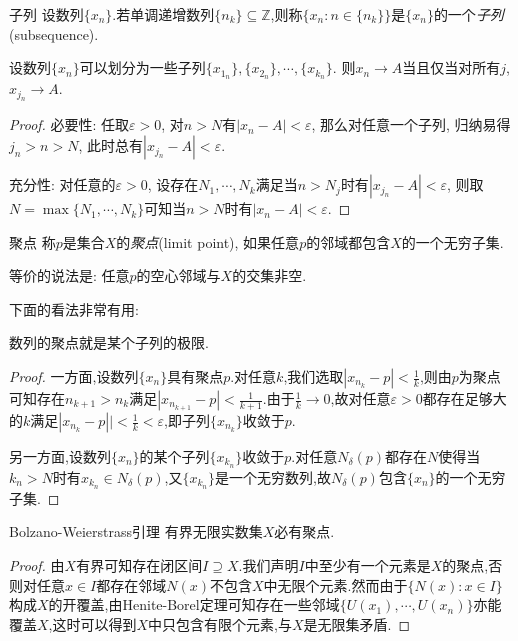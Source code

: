 \begin{definition}{子列}
	设数列$\{ x_n \}$.若单调递增数列$\{ n_k \} \subseteq \mathbb{Z}$,则称$\{ x_n:n \in  \{ n_k \} \}$是$\{ x_n \}$的一个\textit{子列}(subsequence).
\end{definition}

\begin{proposition}{}
	设数列$\{ x_n \}$可以划分为一些子列$\{ x_{1_n} \},\{ x_{2_n} \},\cdots ,\{ x_{k_n} \}$. 则$x_n \to A$当且仅当对所有$j$, $x_{j_n} \to A$. 
\end{proposition}
\begin{proof}
	必要性: 任取$\varepsilon >0$, 对$n>N$有$|x_n-A|<\varepsilon$, 那么对任意一个子列, 归纳易得$j_n>n>N$, 此时总有$|x_{j_n}-A|<\varepsilon$.
	
	充分性: 对任意的$\varepsilon >0$, 设存在$N_1,\cdots ,N_k$满足当$n>N_j$时有$|x_{j_n}-A|<\varepsilon$, 则取$N=\max \{ N_1,\cdots ,N_k \}$可知当$n>N$时有$|x_n-A|<\varepsilon$.
\end{proof}

\begin{definition}{聚点}
	称$p$是集合$X$的\textit{聚点}(limit point), 如果任意$p$的邻域都包含$X$的一个无穷子集.
\end{definition}
\begin{remark}
	等价的说法是: 任意$p$的空心邻域与$X$的交集非空. 
\end{remark}

下面的看法非常有用:

\begin{proposition}{}
	数列的聚点就是某个子列的极限.
\end{proposition}
\begin{proof}
	一方面,设数列$\{ x_n \}$具有聚点$p$.对任意$k$,我们选取$|x_{n_k}-p|<\frac{1}{k}$,则由$p$为聚点可知存在$n_{k+1}>n_k$满足$|x_{n_{k+1}}-p|<\frac{1}{k+1}$.由于$\frac{1}{k} \to 0$,故对任意$\varepsilon >0$都存在足够大的$k$满足$|x_{n_k}-p||<\frac{1}{k}<\varepsilon$,即子列$\{ x_{n_k} \}$收敛于$p$.
	
	另一方面,设数列$\{ x_n \}$的某个子列$\{ x_{k_n} \}$收敛于$p$.对任意$N_{\delta}(p)$都存在$N$使得当$k_n>N$时有$x_{k_n} \in N_{\delta}(p)$,又$\{ x_{k_n} \}$是一个无穷数列,故$N_{\delta}(p)$包含$\{ x_n \}$的一个无穷子集.
\end{proof}

\begin{lemma}{Bolzano-Weierstrass引理}
	有界无限实数集$X$必有聚点.
\end{lemma}
\begin{proof}
	由$X$有界可知存在闭区间$I \supseteq X$.我们声明$I$中至少有一个元素是$X$的聚点,否则对任意$x \in I$都存在邻域$N(x)$不包含$X$中无限个元素.然而由于$\{ N(x):x \in I \}$构成$X$的开覆盖,由Henite-Borel定理可知存在一些邻域$\{ U(x_1),\cdots ,U(x_n) \}$亦能覆盖$X$,这时可以得到$X$中只包含有限个元素,与$X$是无限集矛盾.
\end{proof}


